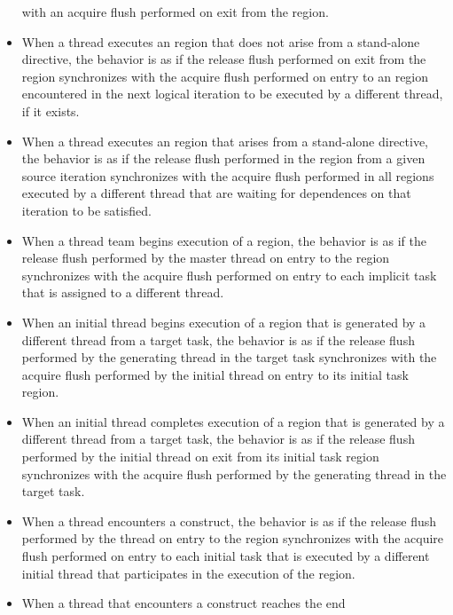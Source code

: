 \begin{itemize}
      with an acquire flush performed on exit from the  region.
\item When a thread executes an  region that does not arise from
      a stand-alone  directive, the behavior is as if the
      release flush performed on exit from the region
      synchronizes with the acquire flush performed on entry to an
       region encountered in the next logical iteration to be
      executed by a different thread, if it exists.
\item When a thread executes an  region that arises from a
      stand-alone  directive, the behavior is as if the
      release flush performed in the  region from a given
      source iteration synchronizes with the acquire flush performed in all
       regions executed by a different thread that are waiting
      for dependences on that iteration to be satisfied.
\item When a thread team begins execution of a  region, the
      behavior is as if the release flush performed by the master thread on
      entry to the  region synchronizes with the acquire
      flush performed on entry to each implicit task that is assigned to a
      different thread.
\item When an initial thread begins execution of a  region
      that is generated by a different thread from a target task, the
      behavior is as if the release flush performed by the generating thread
      in the target task synchronizes with the acquire flush performed by the
      initial thread on entry to its initial task region.
\item When an initial thread completes execution of a  region that is
      generated by a different thread from a target task, the behavior is as
      if the release flush performed by the initial thread on exit from its
      initial task region synchronizes with the acquire flush performed by
      the generating thread in the target task.
\item When a thread encounters a  construct, the behavior is as if the
      release flush performed by the thread on entry to the  region
      synchronizes with the acquire flush performed on entry to each initial
      task that is executed by a different initial thread that participates
      in the execution of the  region.
\item When a thread that encounters a  construct reaches the end

\end{itemize}

